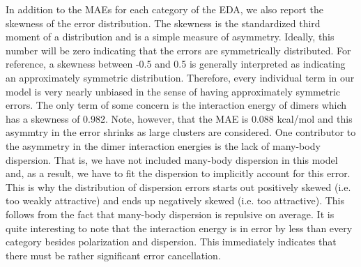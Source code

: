 \documentclass[journal=jacsat,manuscript=article]{achemso}
\begin{document}
In addition to the MAEs for each category of the EDA, we also report the skewness of the error distribution.
The skewness is the standardized third moment of a distribution and is a simple measure of asymmetry.
Ideally, this number will be zero indicating that the errors are symmetrically distributed. For reference,
a skewness between -0.5 and 0.5 is generally interpreted as indicating an approximately symmetric distribution.
Therefore, every individual term in our model is very nearly unbiased in the sense of having approximately
symmetric errors. The only term of some concern is the interaction energy of dimers which
has a skewness of 0.982. Note, however, that the MAE is 0.088 kcal/mol and this asymmtry in the error shrinks
as large clusters are considered.
One contributor to the asymmetry in the dimer interaction energies is the lack of many-body dispersion.
That is, we have not included many-body dispersion in this model and, as a result, we have to fit the dispersion to implicitly account for this error.
This is why the distribution of dispersion errors starts out positively skewed (i.e. too weakly attractive) and
ends up negatively skewed (i.e. too attractive). This follows from the fact that many-body dispersion is repulsive
on average. It is quite interesting to note that the interaction energy
is in error by less than every category besides polarization and dispersion. This immediately indicates that
there must be rather significant error cancellation.
\end{document}
